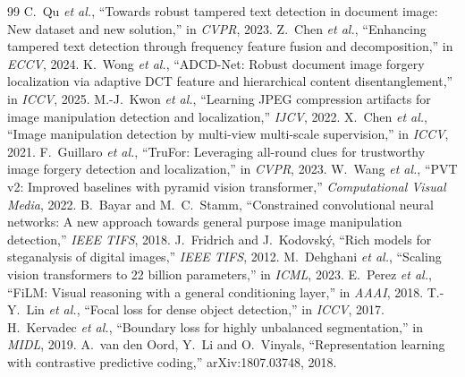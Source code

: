 \documentclass[10pt,a4paper]{article}
\begin{document}
\begin{thebibliography}{99}\small
{} C.~Qu \emph{et al.}, ``Towards robust tampered text detection in document
  image: New dataset and new solution,'' in \emph{CVPR}, 2023.
 Z.~Chen \emph{et al.}, ``Enhancing tampered text detection through frequency
  feature fusion and decomposition,'' in \emph{ECCV}, 2024.
 K.~Wong \emph{et al.}, ``ADCD-Net: Robust document image forgery localization
  via adaptive DCT feature and hierarchical content disentanglement,'' in \emph{ICCV}, 2025.
 M.-J.~Kwon \emph{et al.}, ``Learning JPEG compression artifacts for image
  manipulation detection and localization,'' \emph{IJCV}, 2022.
 X.~Chen \emph{et al.}, ``Image manipulation detection by multi-view
  multi-scale supervision,'' in \emph{ICCV}, 2021.
 F.~Guillaro \emph{et al.}, ``TruFor: Leveraging all-round clues for
  trustworthy image forgery detection and localization,'' in \emph{CVPR}, 2023.
 W.~Wang \emph{et al.}, ``PVT v2: Improved baselines with pyramid vision
  transformer,'' \emph{Computational Visual Media}, 2022.
 B.~Bayar and M.~C.~Stamm, ``Constrained convolutional neural networks: A new
  approach towards general purpose image manipulation detection,'' \emph{IEEE TIFS}, 2018.
 J.~Fridrich and J.~Kodovsk\'y, ``Rich models for steganalysis of digital
  images,'' \emph{IEEE TIFS}, 2012.
 M.~Dehghani \emph{et al.}, ``Scaling vision transformers to 22 billion
  parameters,'' in \emph{ICML}, 2023.
 E.~Perez \emph{et al.}, ``FiLM: Visual reasoning with a general conditioning
  layer,'' in \emph{AAAI}, 2018.
 T.-Y.~Lin \emph{et al.}, ``Focal loss for dense object detection,'' in
  \emph{ICCV}, 2017.
 H.~Kervadec \emph{et al.}, ``Boundary loss for highly unbalanced
  segmentation,'' in \emph{MIDL}, 2019.
 A.~van den Oord, Y.~Li and O.~Vinyals, ``Representation learning with
  contrastive predictive coding,'' arXiv:1807.03748, 2018.
\end{thebibliography}
\end{document}
